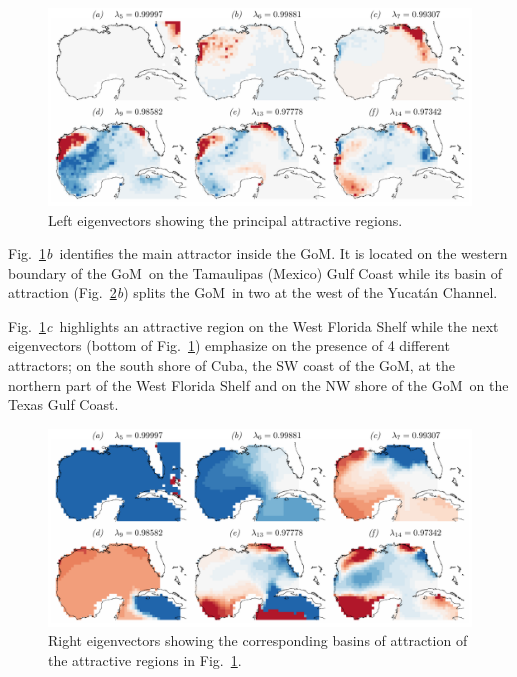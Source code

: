 \documentclass[final]{beamer}
\newcommand{\ib}{\textit{b}}
\newcommand{\ic}{\textit{c}}
\newcommand{\gom}{GoM}
\begin{document}
\begin{frame}[t]
\begin{multicols}{3}
\begin{figure}
\centering
\includegraphics[width=\columnwidth]{figures/fig06}
\caption{Left eigenvectors showing the principal attractive regions.}
\label{fig:l_eig}
\end{figure}

 Fig.~\ref{fig:l_eig}\ib\ identifies the main attractor inside the \gom. It is located on the western boundary of the \gom\ on the Tamaulipas (Mexico) Gulf Coast while its basin of attraction (Fig.~\ref{fig:r_eig}\ib) splits the \gom\ in two at the west of the Yucat\'{a}n Channel. 
 
 Fig.~\ref{fig:l_eig}\ic\ highlights an attractive region on the West Florida Shelf while the next eigenvectors (bottom of Fig.~\ref{fig:l_eig}) emphasize on the presence of 4 different attractors; on  the south shore of Cuba, the SW coast of the \gom, at the northern part of the West Florida Shelf and on the NW shore of the \gom\ on the Texas Gulf Coast.
\begin{figure}
\centering
\includegraphics[width=\columnwidth]{figures/fig07}
\caption{Right eigenvectors showing the corresponding basins of attraction of the attractive regions in Fig.~\ref{fig:l_eig}.}
\label{fig:r_eig}
\end{figure}

\vspace{0.5cm}
\columnbreak

\end{multicols}
\end{frame}
\end{document}
